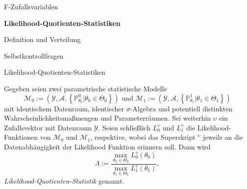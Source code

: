 \documentclass[
  8pt,
  ignorenonframetext,
]{beamer}
\begin{document}
\begin{frame}{}
\protect\hypertarget{section-10}{}
\vfill
\large
{}

F-Zufallsvariablen

\textbf{Likelihood-Quotienten-Statistiken}

Definition und Verteilung

Selbstkontrollfragen \vfill
\end{frame}

\begin{frame}{Likelihood-Quotienten-Statistiken}
\protect\hypertarget{likelihood-quotienten-statistiken}{}
\footnotesize
\begin{definition}
\justifying
Gegeben seien zwei parametrische statistische Modelle 
\begin{equation}
\mathcal{M}_0 := \left(\mathcal{Y},\mathcal{A}, \left\{\mathbb{P}^0_{\theta_0}|\theta_0 \in \Theta_0\right\}\right)
\mbox{ und }
\mathcal{M}_1 := \left(\mathcal{Y},\mathcal{A}, \left\{\mathbb{P}^1_{\theta_1}|\theta_1 \in \Theta_1\right\}\right)
\end{equation}
mit identischem Datenraum, identischer $\sigma$-Algebra und potentiell distinkten 
Wahrscheinlichkeitsmaßmengen und Parameterräumen. Sei weiterhin $\upsilon$ 
ein Zufallsvektor mit Datenraum $\mathcal{Y}$. Seien schließlich $L_0^\upsilon$ 
und $L_1^\upsilon$ die Likelihood-Funktionen von $\mathcal{M}_0$ und $\mathcal{M}_1$, 
respektive, wobei das Superskript $^\upsilon$ jeweils an die Datenabhängigkeit 
der Likelihood Funktion erinnern soll. Dann wird 
\begin{equation}
\Lambda := \frac{\max_{\theta_0 \in \Theta_0}L^\upsilon_0(\theta_0)}{\max_{\theta_1 \in \Theta_1}L^\upsilon_1(\theta_1)}, 
\end{equation}
\textit{Likelihood-Quotienten-Statistik} genannt.
\end{definition}
\end{frame}
\end{document}
